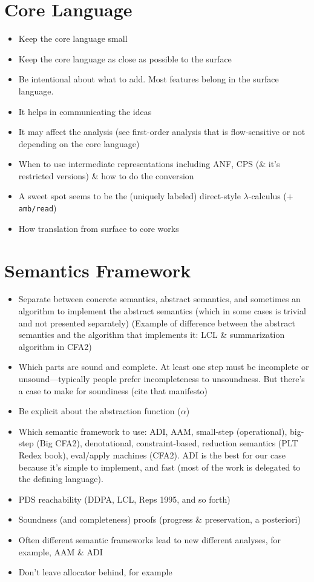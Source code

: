 \documentclass[12pt, oneside]{book}
\begin{document}
\section{Core Language}
\label{section:core-language}

\begin{itemize}
  \item Keep the core language small
  \item Keep the core language as close as possible to the surface
  \item Be intentional about what to add. Most features belong in the surface language.
  \item It helps in communicating the ideas
  \item It may affect the analysis (see first-order analysis that is flow-sensitive or not depending on the core language)
  \item When to use intermediate representations including ANF, CPS (\& it’s restricted versions) \& how to do the conversion
  \item A sweet spot seems to be the (uniquely labeled) direct-style \(λ\)-calculus (+ \texttt{amb/read})
  \item How translation from surface to core works
\end{itemize}

\section{Semantics Framework}
\label{section:semantics-framework}

\begin{itemize}
  \item Separate between concrete semantics, abstract semantics, and sometimes an algorithm to implement the abstract semantics (which in some cases is trivial and not presented separately) (Example of difference between the abstract semantics and the algorithm that implements it: LCL \& summarization algorithm in CFA2)
  \item Which parts are sound and complete. At least one step must be incomplete or unsound—typically people prefer incompleteness to unsoundness. But there’s a case to make for soundiness (cite that manifesto)
  \item Be explicit about the abstraction function (\(α\))
  \item Which semantic framework to use: ADI, AAM, small-step (operational), big-step (Big CFA2), denotational, constraint-based, reduction semantics (PLT Redex book), eval/apply machines (CFA2). ADI is the best for our case because it’s simple to implement, and fast (most of the work is delegated to the defining language).
  \item PDS reachability (DDPA, LCL, Reps 1995, and so forth)
  \item Soundness (and completeness) proofs (progress \& preservation, a posteriori)
  \item Often different semantic frameworks lead to new different analyses, for example, AAM \& ADI
  \item Don’t leave allocator behind, for example
\end{itemize}
\end{document}
